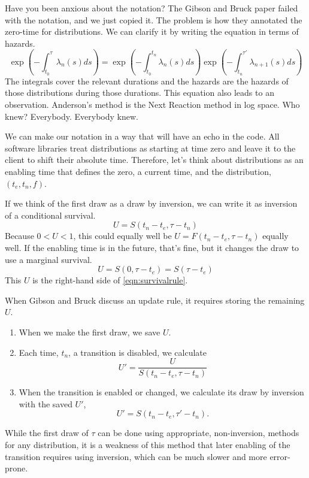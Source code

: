 \documentclass{article}
\begin{document}
Have you been anxious about the notation? The Gibson and Bruck paper failed with the notation, and we just copied it. The problem is how they annotated the zero-time for distributions. We can clarify it by writing the equation in terms of hazards.
\begin{equation}
	\exp\left(-\int_{t_0}^{\tau}\lambda_n(s)ds\right) = \exp\left(-\int_{t_0}^{t_n}\lambda_n(s)ds\right)\exp\left(-\int_{t_n}^{\tau'}\lambda_{n+1}(s)ds\right)
\end{equation}
The integrals cover the relevant durations and the hazards are the hazards of those distributions during those durations. This equation also leads to an observation. Anderson's method is the Next Reaction method in log space. Who knew? Everybody. Everybody knew.

We can make our notation in a way that will have an echo in the code. All software libraries treat distributions as starting at time zero and leave it to the client to shift their absolute time. Therefore, let's think about distributions as an enabling time that defines the zero, a current time, and the distribution, $(t_e, t_n, f)$.

If we think of the first draw as a draw by inversion, we can write it as inversion of a conditional survival.
\begin{equation}
	U = S(t_n - t_e, \tau - t_n)
\end{equation}
Because $0<U<1$, this could equally well be $U=F(t_n-t_e, \tau-t_n)$ equally well. If the enabling time is in the future, that's fine, but it changes the draw to use a marginal survival.
\begin{equation}
	U = S(0, \tau - t_e) = S(\tau - t_e)
\end{equation}
This $U$ is the right-hand side of \ref{eqn:survivalrule}.

When Gibson and Bruck discuss an update rule, it requires storing the remaining $U$.
\begin{enumerate}
	\item When we make the first draw, we save $U$.
	\item Each time, $t_n$, a transition is disabled, we calculate
		\begin{equation}
			U'=\frac{U}{S(t_n-t_e, \tau - t_n)}
		\end{equation}
	\item When the transition is enabled or changed, we calculate its draw by inversion with the saved $U'$,
	\begin{equation}
		U'=S(t_n-t_e, \tau' - t_n).
	\end{equation}
\end{enumerate}
While the first draw of $\tau$ can be done using appropriate, non-inversion, methods for any distribution, it is a weakness of this method that later enabling of the transition requires using inversion, which can be much slower and more error-prone.
\end{document}
